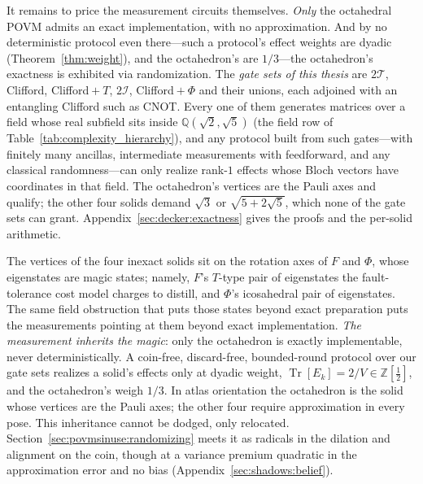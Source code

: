 \documentclass[11pt, oneside, openany]{scrbook}
\DeclareMathOperator{\Tr}{Tr}
\newcommand{\R}{\mathbb{R}}
\newcommand{\Id}{\mathbbm{1}}
\newcommand{\Tgroup}{\mathcal{T}}  %
\newcommand{\Igroup}{\mathcal{I}}  %
\newcommand{\TwoT}{2\Tgroup}
\newcommand{\TwoI}{2\Igroup}
\begin{document}
It remains to price the measurement circuits themselves. \textit{Only} the octahedral POVM admits an exact implementation, with no approximation. And by no deterministic protocol even there---such a protocol's effect weights are dyadic (Theorem~\ref{thm:weight}), and the octahedron's are $1/3$---the octahedron's exactness is exhibited via randomization. The \textit{gate sets of this thesis} are $\TwoT$, Clifford, Clifford${}+T$, $\TwoI$, Clifford${}+\Phi$ and their unions, each adjoined with an entangling Clifford such as CNOT. Every one of them generates matrices over a field whose real subfield sits inside $\mathbb{Q}(\sqrt{2},\sqrt{5})$ (the field row of Table~\ref{tab:complexity_hierarchy}), and any protocol built from such gates---with finitely many ancillas, intermediate measurements with feedforward, and any classical randomness---can only realize rank-$1$ effects whose Bloch vectors have coordinates in that field. The octahedron's vertices are the Pauli axes and qualify; the other four solids demand $\sqrt{3}$ or $\sqrt{5+2\sqrt{5}}$, which none of the gate sets can grant. Appendix~\ref{sec:decker:exactness} gives the proofs and the per-solid arithmetic.

The vertices of the four inexact solids sit on the rotation axes of $F$ and $\Phi$, whose eigenstates are magic states; namely, $F$'s $T$-type pair of eigenstates the fault-tolerance cost model charges to distill, and $\Phi$'s icosahedral pair of eigenstates. The same field obstruction that puts those states beyond exact preparation puts the measurements pointing at them beyond exact implementation. \textit{The measurement inherits the magic}: only the octahedron is exactly implementable, never deterministically. A coin-free, discard-free, bounded-round protocol over our gate sets realizes a solid's effects only at dyadic weight, $\Tr[E_k] = 2/V \in \mathbb{Z}[\tfrac{1}{2}]$, and the octahedron's weigh $1/3$. In atlas orientation the octahedron is the solid whose vertices are the Pauli axes; the other four require approximation in every pose. This inheritance cannot be dodged, only relocated. Section~\ref{sec:povmsinuse:randomizing} meets it as radicals in the dilation and alignment on the coin, though at a variance premium quadratic in the approximation error and no bias (Appendix~\ref{sec:shadows:belief}).
\end{document}
